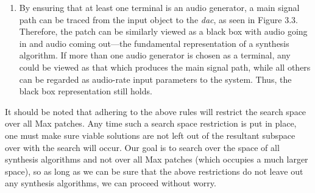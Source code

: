 \documentclass[a4paper,12pt]{report} 	%
\numberwithin{figure}{chapter}
\numberwithin{table}{chapter}
\numberwithin{equation}{chapter}
\begin{document}
\begin{flushleft}
\begin{enumerate}
\begin{figure}[h!]
\begin{center}
\end{center}
\end{figure}
\\
\item By ensuring that at least one terminal is an audio generator, a main signal path can be traced from the input object to the \emph{dac\texttildelow{}}, as seen in Figure 3.3. Therefore, the patch can be similarly viewed as a black box with audio going in and audio coming out---the fundamental representation of a synthesis algorithm. If more than one audio generator is chosen as a terminal, any could be viewed as that which produces the main signal path, while all others can be regarded as audio-rate input parameters to the system. Thus, the black box representation still holds.
\end{enumerate}

It should be noted that adhering to the above rules will restrict the search space over all Max patches. Any time such a search space restriction is put in place, one must make sure viable solutions are not left out of the resultant subspace over with the search will occur. Our goal is to search over the space of all synthesis algorithms and not over all Max patches (which occupies a much larger space), so as long as we can be sure that the above restrictions do not leave out any synthesis algorithms, we can proceed without worry.


\end{flushleft}
\end{document}
